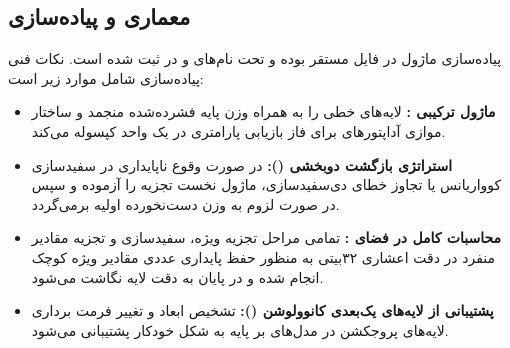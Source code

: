 \subsection{معماری و پیاده‌سازی}
پیاده‌سازی ماژول در فایل  مستقر بوده و تحت نام‌های  و  در  ثبت شده است. نکات فنی پیاده‌سازی شامل موارد زیر است:
\begin{itemize}
    \item \textbf{ماژول ترکیبی :} لایه‌های خطی را به همراه وزن پایه فشرده‌شده منجمد و ساختار موازی آداپتورهای  برای فاز بازیابی پارامتری در یک واحد کپسوله می‌کند.
    \item \textbf{استراتژی بازگشت دوبخشی ():} در صورت وقوع ناپایداری در سفیدسازی کوواریانس یا تجاوز خطای دی‌سفیدسازی، ماژول نخست تجزیه  را آزموده و سپس در صورت لزوم به وزن دست‌نخورده اولیه برمی‌گردد.
    \item \textbf{محاسبات کامل در فضای :} تمامی مراحل تجزیه ویژه، سفیدسازی و تجزیه مقادیر منفرد در دقت اعشاری ۳۲بیتی به منظور حفظ پایداری عددی مقادیر ویژه کوچک انجام شده و در پایان به دقت لایه نگاشت می‌شود.
    \item \textbf{پشتیبانی از لایه‌های یک‌بعدی کانوولوشن ():} تشخیص ابعاد و تغییر فرمت برداری لایه‌های پروجکشن در مدل‌های بر پایه  به شکل خودکار پشتیبانی می‌شود.
\end{itemize}
